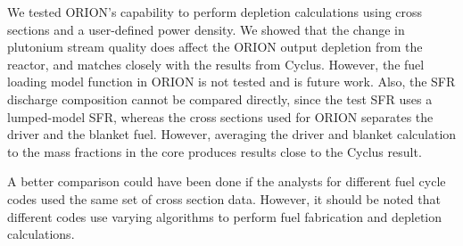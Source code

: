 \documentclass{article}
\begin{document}
We tested ORION's capability to perform depletion calculations
using cross sections and a user-defined power density. We showed that
the change in plutonium stream quality does affect the ORION output depletion
from the reactor, and matches closely with the results from Cyclus.
However, the fuel loading model function in ORION is not tested
and is future work. Also, the \gls{SFR} discharge composition cannot be
compared directly, since the test \gls{SFR} uses a lumped-model \gls{SFR},
whereas the cross sections used for ORION separates the driver and the blanket fuel.
However, averaging the driver and blanket calculation to the mass fractions in the core
produces results close to the Cyclus result.

A better comparison could have been done if the analysts for different fuel cycle
codes used the same set of cross section data. However, it should be noted that
different codes use varying algorithms to perform fuel fabrication and depletion
calculations.




\end{document}
